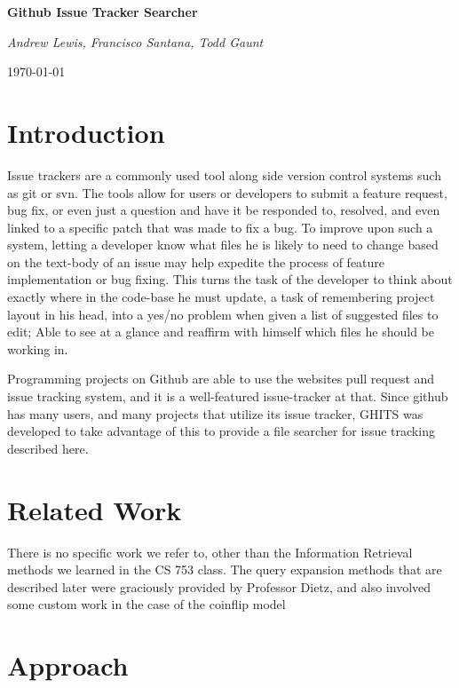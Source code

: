 \documentclass[10pt,a4paper]{article}
\begin{document}
\begin{center}
  {\huge\bfseries Github Issue Tracker Searcher\par}
  \vspace{1cm}
  {\Large\itshape Andrew Lewis, Francisco Santana, Todd Gaunt\par}
  \vspace{0.5cm}
  {\large\today\par}
\end{center}

\section{Introduction}

Issue trackers are a commonly used tool along side version control systems such
as git or svn. The tools allow for users or developers to submit a feature
request, bug fix, or even just a question and have it be responded to, resolved,
and even linked to a specific patch that was made to fix a bug. To improve upon
such a system, letting a developer know what files he is likely to need to change
based on the text-body of an issue may help expedite the process of feature
implementation or bug fixing. This turns the task of the developer to think about
exactly where in the code-base he must update, a task of remembering project
layout in his head, into a yes/no problem when given a list of suggested files
to edit; Able to see at a glance and reaffirm with himself which files he should
be working in.

Programming projects on Github are able to use the websites pull request and
issue tracking system, and it is a well-featured issue-tracker at that. Since
github has many users, and many projects that utilize its issue tracker, GHITS
was developed to take advantage of this to provide a file searcher for
issue tracking described here.

\section{Related Work}

There is no specific work we refer to, other than the Information Retrieval methods we learned in the CS 753 class. The query expansion methods that are described later were graciously provided by Professor Dietz, and also involved some custom work in the case of the coinflip model

\section{Approach}
\end{document}

